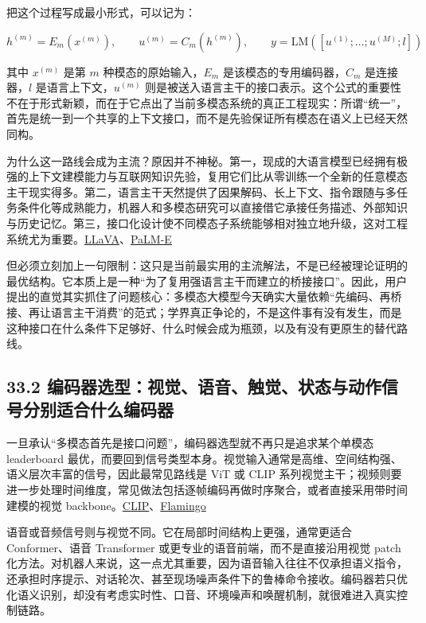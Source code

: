把这个过程写成最小形式，可以记为：

\begingroup
\scriptsize
\begin{equation*}
h^{(m)} = E_m(x^{(m)}), \qquad
u^{(m)} = C_m(h^{(m)}), \qquad
y = \mathrm{LM}\!\left([u^{(1)};\dots;u^{(M)};l]\right)
\end{equation*}
\endgroup

其中 \(x^{(m)}\) 是第 \(m\) 种模态的原始输入，\(E_m\) 是该模态的专用编码器，\(C_m\) 是连接器，\(l\) 是语言上下文，\(u^{(m)}\) 则是被送入语言主干的接口表示。这个公式的重要性不在于形式新颖，而在于它点出了当前多模态系统的真正工程现实：所谓“统一”，首先是统一到一个共享的上下文接口，而不是先验保证所有模态在语义上已经天然同构。

为什么这一路线会成为主流？原因并不神秘。第一，现成的大语言模型已经拥有极强的上下文建模能力与互联网知识先验，复用它们比从零训练一个全新的任意模态主干现实得多。第二，语言主干天然提供了因果解码、长上下文、指令跟随与多任务条件化等成熟能力，机器人和多模态研究可以直接借它承接任务描述、外部知识与历史记忆。第三，接口化设计使不同模态子系统能够相对独立地升级，这对工程系统尤为重要。\href{https://arxiv.org/abs/2304.08485}{LLaVA}、\href{https://arxiv.org/abs/2303.03378}{PaLM-E}

但必须立刻加上一句限制：这只是当前最实用的主流解法，不是已经被理论证明的最优结构。它本质上是一种“为了复用强语言主干而建立的桥接接口”。因此，用户提出的直觉其实抓住了问题核心：多模态大模型今天确实大量依赖“先编码、再桥接、再让语言主干消费”的范式；学界真正争论的，不是这件事有没有发生，而是这种接口在什么条件下足够好、什么时候会成为瓶颈，以及有没有更原生的替代路线。

\subsection*{33.2 编码器选型：视觉、语音、触觉、状态与动作信号分别适合什么编码器}


一旦承认“多模态首先是接口问题”，编码器选型就不再只是追求某个单模态 leaderboard 最优，而要回到信号类型本身。视觉输入通常是高维、空间结构强、语义层次丰富的信号，因此最常见路线是 ViT 或 CLIP 系列视觉主干；视频则要进一步处理时间维度，常见做法包括逐帧编码再做时序聚合，或者直接采用带时间建模的视觉 backbone。\href{https://arxiv.org/abs/2103.00020}{CLIP}、\href{https://arxiv.org/abs/2204.14198}{Flamingo}

语音或音频信号则与视觉不同。它在局部时间结构上更强，通常更适合 Conformer、语音 Transformer 或更专业的语音前端，而不是直接沿用视觉 patch 化方法。对机器人来说，这一点尤其重要，因为语音输入往往不仅承担语义指令，还承担时序提示、对话轮次、甚至现场噪声条件下的鲁棒命令接收。编码器若只优化语义识别，却没有考虑实时性、口音、环境噪声和唤醒机制，就很难进入真实控制链路。

